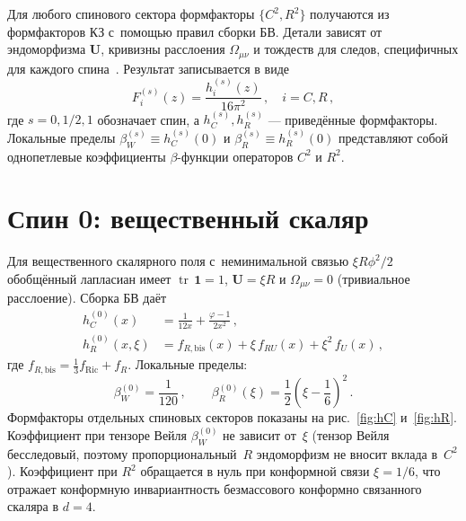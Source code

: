 \documentclass[12pt,a4paper]{article}
\newcommand{\tr}{\operatorname{tr}}
\begin{document}
Для любого спинового сектора формфакторы $\{C^2, R^2\}$ получаются из
формфакторов КЗ с~помощью правил сборки БВ. Детали зависят от
эндоморфизма $\mathbf{U}$, кривизны расслоения $\Omega_{\mu\nu}$ и
тождеств для следов, специфичных для каждого
спина~\cite{Barvinsky:1987uw,Parker:2009uva}.
Результат записывается в виде
\begin{equation}
  F_i^{(s)}(z) = \frac{h_i^{(s)}(z)}{16\pi^2}\,,\quad i = C, R\,,
  \label{eq:Fi-hi}
\end{equation}
где $s = 0, 1/2, 1$ обозначает спин, а $h_C^{(s)}, h_R^{(s)}$ --- приведённые
формфакторы. Локальные пределы $\beta_W^{(s)} \equiv h_C^{(s)}(0)$ и
$\beta_R^{(s)} \equiv h_R^{(s)}(0)$ представляют собой однопетлевые
коэффициенты $\beta$-функции операторов $C^2$ и $R^2$.


\section{Спин 0: вещественный скаляр}
\label{sec:scalar}

Для вещественного скалярного поля с~неминимальной связью $\xi R\phi^2/2$
обобщённый лапласиан имеет $\tr\,\mathbf{1} = 1$, $\mathbf{U} = \xi R$ и
$\Omega_{\mu\nu} = 0$ (тривиальное расслоение). Сборка БВ даёт
\begin{subequations}
\label{eq:scalar-ff}
\begin{align}
  h_C^{(0)}(x) &= \frac{1}{12x} + \frac{\varphi - 1}{2x^2}\,,
  \label{eq:hC0}\\
  h_R^{(0)}(x,\xi) &= f_{R,\text{bis}}(x)
    + \xi\,f_{RU}(x) + \xi^2\,f_U(x)\,,
  \label{eq:hR0}
\end{align}
\end{subequations}
где $f_{R,\text{bis}} = \tfrac{1}{3}f_{\text{Ric}} + f_R$.
Локальные пределы:
\begin{equation}
  \beta_W^{(0)} = \frac{1}{120}\,,\qquad
  \beta_R^{(0)}(\xi) = \frac{1}{2}\left(\xi - \frac{1}{6}\right)^{\!2}\,.
  \label{eq:beta-scalar}
\end{equation}
Формфакторы отдельных спиновых секторов показаны на
рис.~\ref{fig:hC} и~\ref{fig:hR}.
Коэффициент при тензоре Вейля $\beta_W^{(0)}$ не зависит от~$\xi$ (тензор
Вейля бесследовый, поэтому пропорциональный~$R$ эндоморфизм не вносит вклада
в~$C^2$). Коэффициент при $R^2$ обращается в нуль при конформной связи
$\xi = 1/6$, что отражает конформную инвариантность безмассового конформно
связанного скаляра в $d = 4$.
\end{document}
